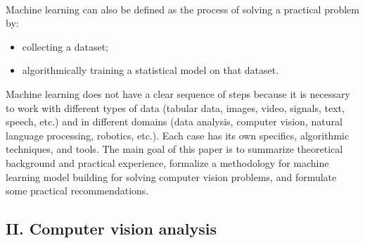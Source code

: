 \documentclass{article}
\begin{document}
{{\begin{multicols}
\begin{fi}
    \end{fi}
    \newline
\\\hspace{4mm}Machine learning can also be defined as the process of solving a practical problem by:
\begin{itemize}
    \item collecting a dataset;
    \item algorithmically training a statistical model on that dataset.
\end{itemize}
\hspace{4mm}Machine learning does not have a clear sequence of steps because it is necessary to work with different types of data (tabular data, images, video, signals, text, speech, etc.) and in different domains (data analysis, computer vision, natural language processing, robotics, etc.). Each case has its own specifics, algorithmic techniques, and tools. The main goal of this paper is to summarize theoretical background and practical experience, formalize a methodology for machine learning model building for solving computer vision problems, and formulate some practical recommendations.
\subsection*{II. Computer vision analysis}

\end{multicols}}}
\end{document}
